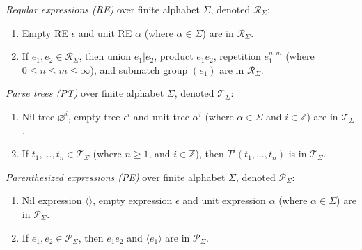 \documentclass[AMA,STIX1COL]{WileyNJD-v2}
\newcommand{\Xl}{\langle}
\newcommand{\Xr}{\rangle}
\newcommand{\Xm}{\langle\!\rangle}
\newcommand{\XP}{\mathcal{P}}
\newcommand{\XR}{\mathcal{R}}
\newcommand{\XT}{\mathcal{T}}
\newcommand{\YZ}{\mathbb{Z}}
\begin{document}
    \begin{definition}
    \emph{Regular expressions (RE)} over finite alphabet $\Sigma$, denoted $\XR_\Sigma$:
    \begin{enumerate}
        \item
          Empty RE $\epsilon$ and
          unit RE $\alpha$ (where $\alpha \in \Sigma$) are in $\XR_\Sigma$.
        \item If $e_1, e_2 \in \XR_\Sigma$, then
          union $e_1 | e_2$,
          product $e_1 e_2$,
          repetition $e_1^{n, m}$ (where $0 \leq n \leq m \leq \infty$), and
          submatch group $(e_1)$
          are in $\XR_\Sigma$.
    \end{enumerate}
    \end{definition}


    \begin{definition}
    \emph{Parse trees (PT)} over finite alphabet $\Sigma$, denoted $\XT_\Sigma$:
    \begin{enumerate}
        \item
          Nil tree ${\varnothing}^i$,
          empty tree ${\epsilon}^i$ and
          unit tree ${\alpha}^i$ (where $\alpha \in \Sigma$ and $i \in \YZ$)
          are in $\XT_\Sigma$.
        \item If $t_1, \dots, t_n \in \XT_\Sigma$ (where $n \geq 1$, and $i \in \YZ$), then
          ${T}^i(t_1, \dots, t_n)$
          is in $\XT_\Sigma$.
    \end{enumerate}
    \end{definition}


    \begin{definition}
    \emph{Parenthesized expressions (PE)} over finite alphabet $\Sigma$, denoted $\XP_\Sigma$:
    \begin{enumerate}
        \item
            Nil expression $\Xm$,
            empty expression $\epsilon$ and
            unit expression $\alpha$ (where $\alpha \in \Sigma$)
            are in $\XP_\Sigma$.
        \item If $e_1, e_2 \in \XP_\Sigma$, then
            $e_1 e_2$ and
            $\Xl e_1 \Xr$
            are in $\XP_\Sigma$.
    \end{enumerate}
    \end{definition}
\end{document}
